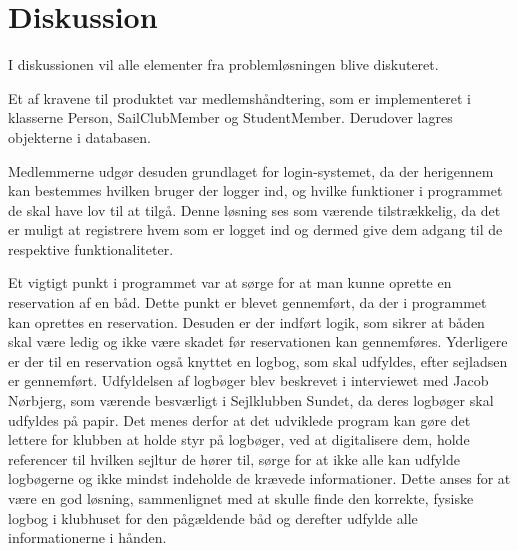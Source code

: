 \chapter{Diskussion}

I diskussionen vil alle elementer fra problemløsningen blive diskuteret. 

Et af kravene til produktet var medlemshåndtering, som er implementeret i klasserne Person, SailClubMember og StudentMember. 
Derudover lagres objekterne i databasen. 

Medlemmerne udgør desuden grundlaget for login-systemet, da der herigennem kan bestemmes hvilken bruger der logger ind, og hvilke funktioner i programmet de skal have lov til at tilgå.  
Denne løsning ses som værende tilstrækkelig, da det er muligt at registrere hvem som er logget ind og dermed give dem adgang til de respektive funktionaliteter. 

Et vigtigt punkt i programmet var at sørge for at man kunne oprette en reservation af en båd. 
Dette punkt er blevet gennemført, da der i programmet kan oprettes en reservation. 
Desuden er der indført logik, som sikrer at båden skal være ledig og ikke være skadet før reservationen kan gennemføres. 
Yderligere er der til en reservation også knyttet en logbog, som skal udfyldes, efter sejladsen er gennemført. 
Udfyldelsen af logbøger blev beskrevet i interviewet med Jacob Nørbjerg, som værende besværligt i Sejlklubben Sundet, da deres logbøger skal udfyldes på papir. 
Det menes derfor at det udviklede program kan gøre det lettere for klubben at holde styr på logbøger, ved at digitalisere dem, holde referencer til hvilken sejltur de hører til, sørge for at ikke alle kan udfylde logbøgerne og ikke mindst indeholde de krævede informationer. 
Dette anses for at være en god løsning, sammenlignet med at skulle finde den korrekte, fysiske logbog i klubhuset for den pågældende båd og derefter udfylde alle informationerne i hånden. 

